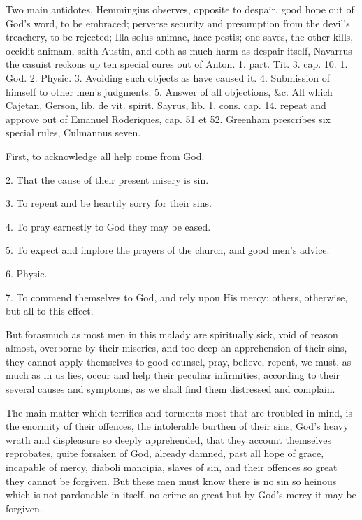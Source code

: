 {Two main antidotes, Hemmingius observes, opposite to despair,
good hope out of God's word, to be embraced; perverse security and
presumption from the devil's treachery, to be rejected; Illa solus
animae, haec pestis; one saves, the other kills, occidit animam, saith
Austin, and doth as much harm as despair itself, Navarrus the
casuist reckons up ten special cures out of Anton. 1. part. Tit. 3.
cap. 10. 1. God. 2. Physic. 3. Avoiding such objects as have
caused it. 4. Submission of himself to other men's judgments. 5. Answer
of all objections, \&c. All which Cajetan, Gerson, lib. de vit. spirit.
Sayrus, lib. 1. cons. cap. 14. repeat and approve out of Emanuel
Roderiques, cap. 51 et 52. Greenham prescribes six special rules,
Culmannus seven.

First, to acknowledge all help come from God.

2. That the cause of their present misery is sin.

3. To repent and be heartily sorry for their sins.

4. To pray earnestly to God they may be eased.

5. To expect and implore the prayers of the church, and good men's advice.

6. Physic.

7. To commend themselves to God, and rely upon His mercy: others, otherwise, but all to this effect.

But forasmuch as most men in
this malady are spiritually sick, void of reason almost, overborne by
their miseries, and too deep an apprehension of their sins, they cannot
apply themselves to good counsel, pray, believe, repent, we must, as
much as in us lies, occur and help their peculiar infirmities,
according to their several causes and symptoms, as we shall find them
distressed and complain.

The main matter which terrifies and torments most that are troubled in
mind, is the enormity of their offences, the intolerable burthen of
their sins, God's heavy wrath and displeasure so deeply apprehended,
that they account themselves reprobates, quite forsaken of God, already
damned, past all hope of grace, incapable of mercy, diaboli mancipia,
slaves of sin, and their offences so great they cannot be forgiven. But
these men must know there is no sin so heinous which is not pardonable
in itself, no crime so great but by God's mercy it may be forgiven.

}
